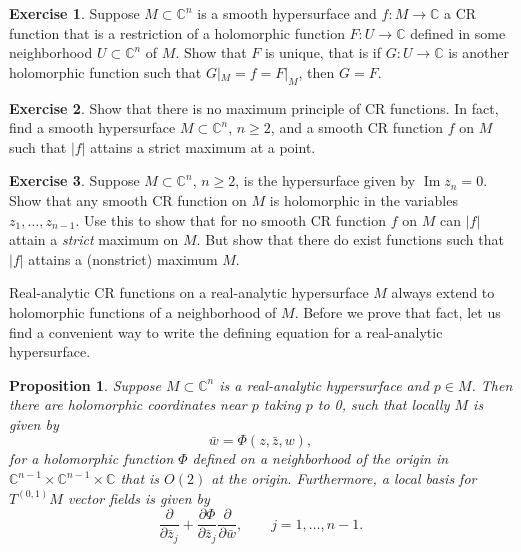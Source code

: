 \documentclass[12pt,openany]{book}
\renewcommand{\Im}{\operatorname{Im}}
\newcommand{\sabs}[1]{\lvert {#1} \rvert}
\newcommand{\C}{{\mathbb{C}}}
\theoremstyle{plain}
\newtheorem{prop}[thm]{Proposition}
\theoremstyle{remark}
\theoremstyle{definition}
\newenvironment{exbox}{%
    \def\FrameCommand{\vrule width 1pt \relax\hspace {10pt}}%
    \MakeFramed {\advance \hsize -\width \FrameRestore }%
}{%
    \endMakeFramed
}
\theoremstyle{exercise}
\newtheorem{exercise}{Exercise}[section]
\theoremstyle{example}
\begin{document}
\begin{exbox}
\begin{exercise}
Suppose $M \subset \C^n$ is a smooth hypersurface
and $f \colon M \to \C$ a CR function that is a restriction
of a holomorphic function $F \colon U \to \C$ defined in
some neighborhood $U \subset \C^n$ of $M$.  Show that $F$ is unique,
that is if $G \colon U \to \C$ is another holomorphic function such that
$G|_M = f = F|_M$, then $G=F$.
\end{exercise}

\begin{exercise}
Show that there is no maximum principle of CR functions.  In fact, find a
smooth hypersurface $M \subset \C^n$, $n \geq 2$, and a smooth CR function
$f$ on $M$ such that $\sabs{f}$ attains a strict maximum at a point.
\end{exercise}

\begin{exercise}
Suppose $M \subset \C^n$, $n \geq 2$, is the hypersurface given by $\Im z_n
= 0$.  Show that any smooth CR function on $M$ is holomorphic in the variables
$z_1,\ldots,z_{n-1}$.  Use this to show that for no smooth CR function $f$ on $M$ can
$\sabs{f}$ attain a \emph{strict} maximum on $M$.  But show that there do
exist functions such that $\sabs{f}$ attains a (nonstrict) maximum $M$.
\end{exercise}
\end{exbox}

Real-analytic CR functions on a real-analytic
hypersurface $M$ always extend to holomorphic functions of a neighborhood of $M$.
Before we prove that fact, let us find a convenient way to write the defining
equation for a real-analytic hypersurface.

\begin{prop}
Suppose $M \subset \C^n$ is a real-analytic hypersurface and $p \in M$.
Then there are holomorphic coordinates near $p$ taking $p$ to 0,
such that locally $M$ is given by
\begin{equation*}
\bar{w} = \Phi(z,\bar{z},w) ,
\end{equation*}
for a holomorphic function $\Phi$ defined on a neighborhood of the origin
in $\C^{n-1} \times \C^{n-1} \times \C$ that is $O(2)$ at the origin.
Furthermore, a local basis for $T^{(0,1)} M$ vector fields is given by
\begin{equation*}
\frac{\partial}{\partial \bar{z}_j}
+\frac{\partial \Phi}{\partial \bar{z}_j} \frac{\partial}{\partial \bar{w}} ,
\qquad j=1,\ldots,n-1.
\end{equation*}
\end{prop}
\end{document}
